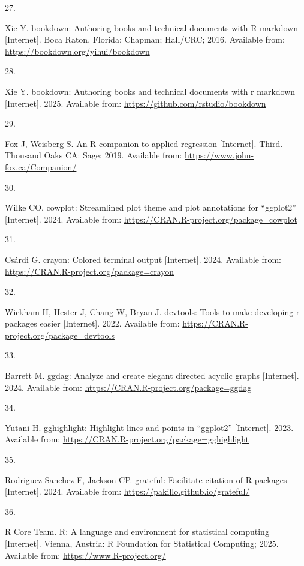 \documentclass[
]{article}
\newlength{\cslhangindent}
\newlength{\csllabelwidth}
\newenvironment{CSLReferences}[2] %
 {\begin{list}{}{%
  \setlength{\itemindent}{0pt}
  \setlength{\leftmargin}{0pt}
  \setlength{\parsep}{0pt}
  \ifodd #1
   \setlength{\leftmargin}{\cslhangindent}
   \setlength{\itemindent}{-1\cslhangindent}
  \fi
  \setlength{\itemsep}{#2\baselineskip}}}
 {\end{list}}
\newcommand{\CSLLeftMargin}[1]{\parbox[t]{\csllabelwidth}{\strut#1\strut}}
\newcommand{\CSLRightInline}[1]{\parbox[t]{\linewidth - \csllabelwidth}{\strut#1\strut}}
\begin{document}
\begin{CSLReferences}{0}{1}
\CSLLeftMargin{27. }%
\CSLRightInline{Xie Y. {bookdown}: Authoring books and technical documents with {R} markdown {[}Internet{]}. Boca Raton, Florida: Chapman; Hall/CRC; 2016. Available from: \url{https://bookdown.org/yihui/bookdown}}

\CSLLeftMargin{28. }%
\CSLRightInline{Xie Y. {bookdown}: Authoring books and technical documents with r markdown {[}Internet{]}. 2025. Available from: \url{https://github.com/rstudio/bookdown}}

\CSLLeftMargin{29. }%
\CSLRightInline{Fox J, Weisberg S. An {R} companion to applied regression {[}Internet{]}. Third. Thousand Oaks {CA}: Sage; 2019. Available from: \url{https://www.john-fox.ca/Companion/}}

\CSLLeftMargin{30. }%
\CSLRightInline{Wilke CO. {cowplot}: Streamlined plot theme and plot annotations for {``{ggplot2}''} {[}Internet{]}. 2024. Available from: \url{https://CRAN.R-project.org/package=cowplot}}

\CSLLeftMargin{31. }%
\CSLRightInline{Csárdi G. {crayon}: Colored terminal output {[}Internet{]}. 2024. Available from: \url{https://CRAN.R-project.org/package=crayon}}

\CSLLeftMargin{32. }%
\CSLRightInline{Wickham H, Hester J, Chang W, Bryan J. {devtools}: Tools to make developing r packages easier {[}Internet{]}. 2022. Available from: \url{https://CRAN.R-project.org/package=devtools}}

\CSLLeftMargin{33. }%
\CSLRightInline{Barrett M. {ggdag}: Analyze and create elegant directed acyclic graphs {[}Internet{]}. 2024. Available from: \url{https://CRAN.R-project.org/package=ggdag}}

\CSLLeftMargin{34. }%
\CSLRightInline{Yutani H. {gghighlight}: Highlight lines and points in {``{ggplot2}''} {[}Internet{]}. 2023. Available from: \url{https://CRAN.R-project.org/package=gghighlight}}

\CSLLeftMargin{35. }%
\CSLRightInline{Rodriguez-Sanchez F, Jackson CP. {grateful}: Facilitate citation of {R} packages {[}Internet{]}. 2024. Available from: \url{https://pakillo.github.io/grateful/}}

\CSLLeftMargin{36. }%
\CSLRightInline{R Core Team. {R}: A language and environment for statistical computing {[}Internet{]}. Vienna, Austria: R Foundation for Statistical Computing; 2025. Available from: \url{https://www.R-project.org/}}


\end{CSLReferences}
\end{document}
